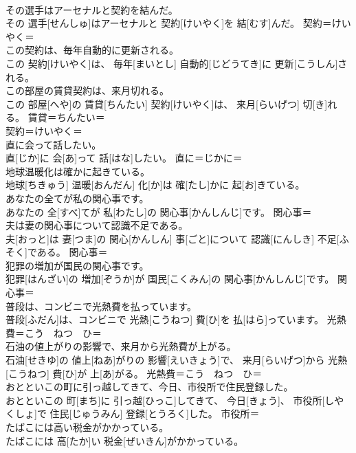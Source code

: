 \documentclass[8pt]{extreport}
\begin{document}
\begin{CJK}{UTF8}{min}
\\	その選手はアーセナルと契約を結んだ。	
\\	その 選手[せんしゅ]はアーセナルと 契約[けいやく]を 結[むす]んだ。	契約＝けいやく＝ 
\\	この契約は、毎年自動的に更新される。	
\\	この 契約[けいやく]は、 毎年[まいとし] 自動的[じどうてき]に 更新[こうしん]される。	
\\	この部屋の賃貸契約は、来月切れる。	
\\	この 部屋[へや]の 賃貸[ちんたい] 契約[けいやく]は、 来月[らいげつ] 切[き]れる。	賃貸＝ちんたい＝ 
\\	契約＝けいやく＝ 
\\	直に会って話したい。	
\\	直[じか]に 会[あ]って 話[はな]したい。	直に＝じかに＝ 
\\	地球温暖化は確かに起きている。	
\\	地球[ちきゅう] 温暖[おんだん] 化[か]は 確[たし]かに 起[お]きている。	
\\	あなたの全てが私の関心事です。	
\\	あなたの 全[すべ]てが 私[わたし]の 関心事[かんしんじ]です。	関心事＝ 
\\	夫は妻の関心事について認識不足である。	
\\	夫[おっと]は 妻[つま]の 関心[かんしん] 事[ごと]について 認識[にんしき] 不足[ふそく]である。	関心事＝ 
\\	犯罪の増加が国民の関心事です。	
\\	犯罪[はんざい]の 増加[ぞうか]が 国民[こくみん]の 関心事[かんしんじ]です。	関心事＝ 
\\	普段は、コンビニで光熱費を払っています。	
\\	普段[ふだん]は、コンビニで 光熱[こうねつ] 費[ひ]を 払[はら]っています。	光熱費＝こう　ねつ　ひ＝ 
\\	石油の値上がりの影響で、来月から光熱費が上がる。	
\\	石油[せきゆ]の 値上[ねあ]がりの 影響[えいきょう]で、 来月[らいげつ]から 光熱[こうねつ] 費[ひ]が 上[あ]がる。	光熱費＝こう　ねつ　ひ＝ 
\\	おとといこの町に引っ越してきて、今日、市役所で住民登録した。	
\\	おとといこの 町[まち]に 引っ越[ひっこ]してきて、 今日[きょう]、 市役所[しやくしょ]で 住民[じゅうみん] 登録[とうろく]した。	市役所＝ 
\\	たばこには高い税金がかかっている。	
\\	たばこには 高[たか]い 税金[ぜいきん]がかかっている。	

\end{CJK}
\end{document}
